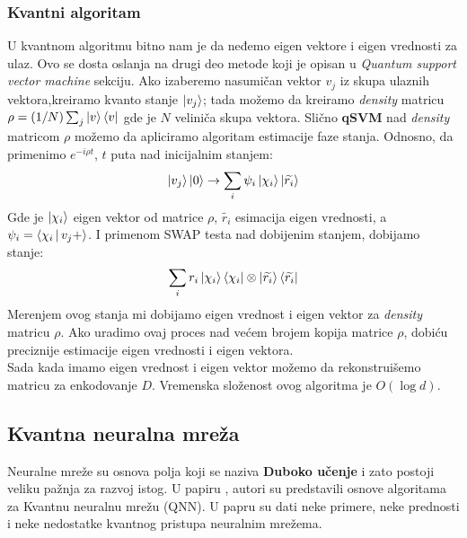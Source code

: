 \documentclass[12pt, letterpaper, oneside]{article}
\begin{document}
\subsubsection{Kvantni algoritam}
U kvantnom algoritmu bitno nam je da neđemo eigen vektore i eigen vrednosti za ulaz. Ovo se dosta oslanja na drugi deo metode koji je opisan u \textit{Quantum support vector machine} sekciju.
Ako izaberemo nasumičan vektor $v_j$ iz skupa ulaznih vektora,kreiramo kvanto stanje $\Ket{v_j}$; tada možemo da kreiramo \textit{density} matricu $\rho = (1/N)\sum_j\Ket{v}\Bra{v}$ gde je $N$ veliniča skupa vektora. \cite{Quantum_machine_learning}
Slično \textbf{qSVM} nad \textit{density} matricom $\rho$ možemo da apliciramo algoritam estimacije faze stanja. Odnosno, da primenimo $e^{-i \rho t}$, $t$ puta nad inicijalnim stanjem:
\[
    \Ket{v_j}\Ket{0} \to \sum_i \psi_i\Ket{\chi_i}\Ket{\widetilde{r_i}}
\] 
Gde je $\Ket{\chi_i}$ eigen vektor od matrice $\rho$, $\widetilde{r_i}$ esimacija eigen vrednosti, a $\psi_i = \Braket{\chi_i|v_j+}$.
I primenom SWAP testa nad dobijenim stanjem, dobijamo stanje:
\[
    \sum_i r_i \Ket{\chi_i}\Bra{\chi_i}\otimes \Ket{\widetilde{r_i}}\Bra{\widetilde{r_i}}
\]
Merenjem ovog stanja mi dobijamo eigen vrednost i eigen vektor za \textit{density} matricu $\rho$. Ako uradimo ovaj proces nad većem brojem kopija matrice $\rho$, dobiću preciznije estimacije eigen vrednosti i eigen vektora. \\
Sada kada imamo eigen vrednost i eigen vektor možemo da rekonstruišemo matricu za enkodovanje $D$. Vremenska složenost ovog algoritma je $O(\log d)$. \cite{Lloyd_2014}

\subsection{Kvantna neuralna mreža}
Neuralne mreže su osnova polja koji se naziva \textbf{Duboko učenje} i zato postoji veliku pažnja za razvoj istog.
U papiru \cite{Classification_wit_QNN}, autori su predstavili osnove algoritama za Kvantnu neuralnu mrežu (QNN).
U papru su dati neke primere, neke prednosti i neke nedostatke kvantnog pristupa neuralnim mrežema.
\end{document}
